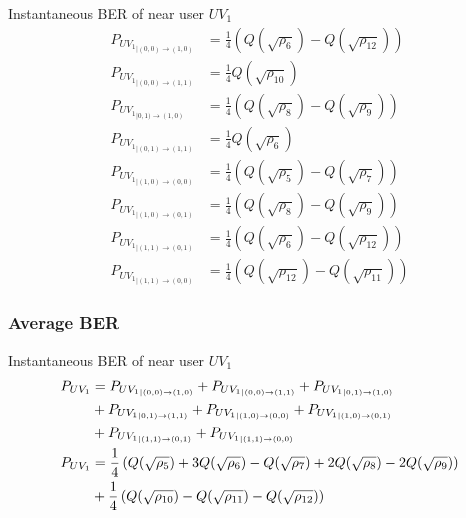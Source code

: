 \documentclass{beamer}
\providecommand{\brak}[1]{\ensuremath{\left(#1\right)}}
\begin{document}
\begin{frame}
\begin{block}{Instantaneous BER of near user $UV_1$}
\begin{align}
P_{{UV_1}_{|(0,0) \rightarrow (1,0)}} &= \frac{1}{4} \brak{ Q(\sqrt{\rho_6})-Q(\sqrt{\rho_{12}})}\\
P_{{UV_1}_{|(0,0) \rightarrow (1,1)}} &=\frac{1}{4}  Q(\sqrt{\rho_{10}}) \\
P_{{UV_1}_{|0,1) \rightarrow (1,0)}} &=  \frac{1}{4} \brak{Q(\sqrt{\rho_8})-Q(\sqrt{\rho_9})}\\
P_{{UV_1}_{|(0,1) \rightarrow (1,1)}} &= \frac{1}{4}  Q(\sqrt{\rho_6}) \\
P_{{UV_1}_{|(1,0) \rightarrow (0,0)}} &= \frac{1}{4} \brak{Q(\sqrt{\rho_5})-Q(\sqrt{\rho_7})}\\
P_{{UV_1}_{|(1,0) \rightarrow (0,1)}} &= \frac{1}{4} \brak{Q(\sqrt{\rho_8})-Q(\sqrt{\rho_9})}\\
P_{{UV_1}_{|(1,1) \rightarrow (0,1)}} &=\frac{1}{4} \brak{ Q(\sqrt{\rho_6})-Q(\sqrt{\rho_{12}})}\\
P_{{UV_1}_{|(1,1) \rightarrow (0,0)}} &=\frac{1}{4} \brak{ Q(\sqrt{\rho_{12}})-Q(\sqrt{\rho_{11}})} 
\end{align}
\end{block}
\end{frame}



\begin{frame}
\frametitle{Average BER}
\begin{block}{Instantaneous BER of near user $UV_1$}
\begin{align}
P_{UV_1} &= P_{{UV_1}_{|(0,0) \rightarrow (1,0)}} +P_{{UV_1}_{|(0,0) \rightarrow (1,1)}} +P_{{UV_1}_{|0,1) \rightarrow (1,0)}} \notag  \\  &+P_{{UV_1}_{|0,1) \rightarrow (1,1)}} + P_{{UV_1}_{|(1,0) \rightarrow (0,0)}} +P_{{UV_1}_{|(1,0) \rightarrow (0,1)}} \notag  \\ & + P_{{UV_1}_{|(1,1) \rightarrow (0,1)}} + P_{{UV_1}_{|(1,1) \rightarrow (0,0)}} \\
P_{UV_1} &= \frac{1}{4} \brak{Q(\sqrt{\rho_5})+3Q(\sqrt{\rho_6})-Q(\sqrt{\rho_7})+2Q(\sqrt{\rho_8})-2Q(\sqrt{\rho_9})} \notag \\ 
 &+\frac{1}{4} \brak{Q(\sqrt{\rho_{10}})-Q(\sqrt{\rho_{11}})-Q(\sqrt{\rho_{12}})} \label{puv1}
\end{align}
\end{block}
\end{frame}
\end{document}
